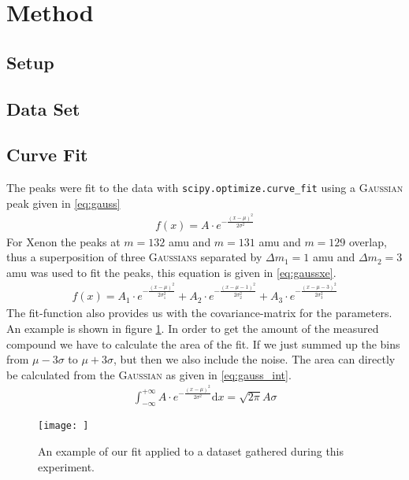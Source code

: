 \newpage
\section{Method} \label{sec:method}
\subsection{Setup}
\subsection{Data Set}
\subsection{Curve Fit}
\label{sec:fit}
The peaks were fit to the data with \texttt{scipy.optimize.curve\_fit}\cite{scipy} using a {\scshape Gaussian} peak given in \eqref{eq:gauss}
\begin{align}
    f(x) = A\cdot e^{-\frac{(x-\mu)^2}{2\sigma^2}} \label{eq:gauss}
\end{align}
For Xenon the peaks at $m=132$ amu and $m=131$ amu and $m=129$ overlap, thus a superposition of three {\scshape Gaussians} separated by $\Delta m_1 = 1$ amu and $\Delta m_2 = 3$ amu was used to fit the peaks, this equation is given in \eqref{eq:gaussxe}.
\begin{align}
    f(x) = A_1\cdot e^{-\frac{(x-\mu)^2}{2\sigma_1^2}} + A_2\cdot e^{-\frac{(x-\mu - 1)^2}{2\sigma_2^2}} + A_3\cdot e^{-\frac{(x-\mu-3)^2}{2\sigma_3^2}} \label{eq:gaussxe}
\end{align}
The fit-function also provides us with the covariance-matrix for the parameters.
An example is shown in figure \ref{fig:gauss_int}. In order to get the amount of the measured compound we have to calculate the area of the fit. If we just summed up the bins from $\mu-3\sigma$ to $\mu+3\sigma$, but then we also include the noise. The area can directly be calculated from the {\scshape Gaussian} as given in \eqref{eq:gauss_int}.
\begin{align}
    \int_{-\infty}^{+\infty} A\cdot e^{-\frac{(x-\mu)^2}{2\sigma^2}} \mathrm{d}x = \sqrt{2\pi}A\sigma \label{eq:gauss_int} 
\end{align}
\begin{figure}[h!]
    \centering
    \texttt{[image: ]}
    \caption{An example of our fit applied to a dataset gathered during this experiment.}
    \label{fig:gauss_int}
\end{figure}


